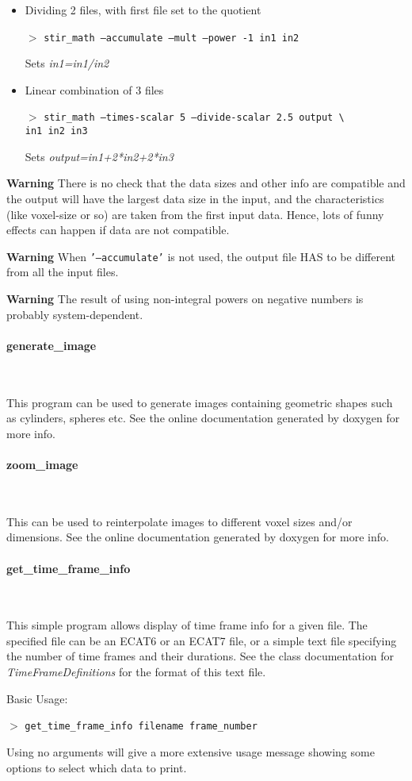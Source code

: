 \documentclass{article}
\newcommand{\subsubsubsection}[1]{\paragraph{#1}\mbox{} \\}
\newcommand{\cmdline}[1]{\par \noindent $>$ \texttt{#1}\par}
\begin{document}
{\begin{itemize}
Sets \textit{output=in1/max(in2,.1)}\\
\item
Dividing 2 files, with first file set to the quotient
\cmdline{stir\_math --accumulate --mult --power -1 in1 in2}


Sets \textit{in1=in1/in2}\\
\item
Linear combination of 3 files
\cmdline{stir\_math --times-scalar 5 --divide-scalar 2.5 output {\textbackslash}\\
in1 in2 in3}


Sets \textit{output=in1+2*in2+2*in3}
\end{itemize}

\textbf{Warning} There is no check that the data sizes and other info 
are compatible and the output will have the largest data size 
in the input, and the characteristics (like voxel-size or so) 
are taken from the first input data. Hence, lots of funny effects 
can happen if data are not compatible.


\textbf{Warning} When \texttt{'--accumulate'} is not used, the output file 
HAS to be different from all the input files.

\textbf{Warning} The result of using non-integral powers on negative 
numbers is probably system-dependent.

{ \subsubsubsection{generate\_image}
}

This program can be used to generate 
images containing geometric shapes such as cylinders, spheres 
etc. See the online documentation generated by doxygen for more 
info.

{ \subsubsubsection{zoom\_image}
}

This can be used to reinterpolate 
images to different voxel sizes and/or dimensions. See the online 
documentation generated by doxygen for more info.

{ \subsubsubsection{get\_time\_frame\_info}
}
\label{sec:get_time_frame_info}
This simple program allows display of time frame info for a given 
file. The specified file can be an ECAT6 or an ECAT7 file, or 
a simple text file specifying the number of time frames and their 
durations. See the class documentation for \textit{TimeFrameDefinitions} 
for the format of this text file.


\noindent
Basic Usage:
\cmdline{get\_time\_frame\_info filename frame\_number}


Using no arguments will give a more extensive usage message showing 
some options to select which data to print.

}
\end{document}
